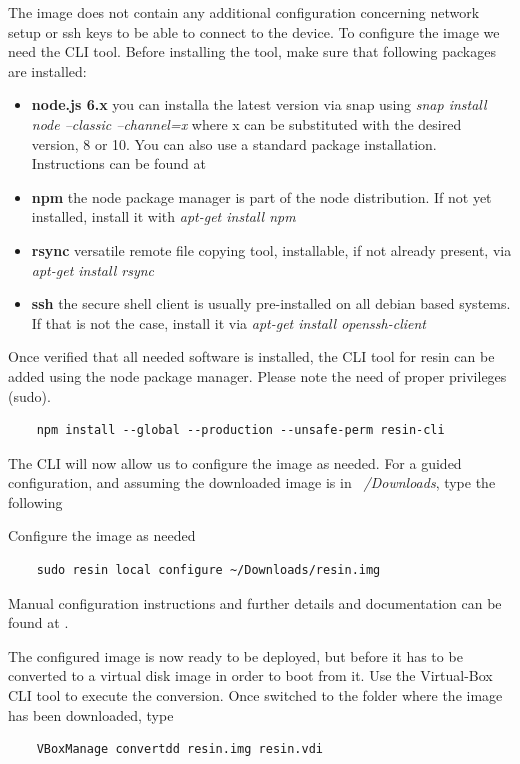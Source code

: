 \documentclass[]{scrartcl}
\begin{document}
The image does not contain any additional configuration concerning network setup or ssh keys to be able to connect to the device. To configure the image we need the CLI tool. Before installing the tool, make sure that following packages are installed:

\begin{itemize}
	
	\item \textbf{node.js 6.x} you can installa the latest version via snap using \textit{snap install node --classic --channel=x} where x can be substituted with the desired version, 8 or 10. You can also use a standard package installation. Instructions can be found at \cite{node01}
	\item \textbf{npm} the node package manager is part of the node distribution. If not yet installed, install it with \textit{apt-get install npm}
	\item \textbf{rsync} versatile remote file copying tool, installable, if not already present, via \textit{apt-get install rsync}
	\item \textbf{ssh} the secure shell client is usually pre-installed on all debian based systems. If that is not the case, install it via \textit{apt-get install openssh-client}
	
\end{itemize}

Once verified that all needed software is installed, the CLI tool for resin can be added using the node package manager. Please note the need of proper privileges (sudo).

\begin{verbatim}
	npm install --global --production --unsafe-perm resin-cli
\end{verbatim}

The CLI will now allow us to configure the image as needed. For a guided configuration, and assuming the downloaded image is in \textit{~/Downloads}, type the following 

Configure the image as needed
\begin{verbatim}
	sudo resin local configure ~/Downloads/resin.img
\end{verbatim}

Manual configuration instructions and further details and documentation can be found at \cite{resin02}.

The configured image is now ready to be deployed, but before it has to be converted to a virtual disk image in order to boot from it. Use the Virtual-Box CLI tool to execute the conversion. Once switched to the folder where the image has been downloaded, type
\begin{verbatim}
	VBoxManage convertdd resin.img resin.vdi
\end{verbatim}
\end{document}
